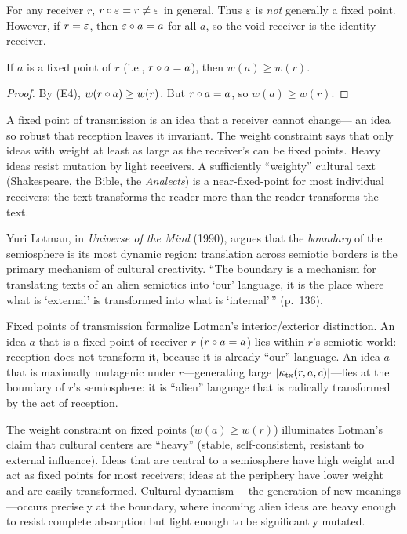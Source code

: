\begin{proposition}
For any receiver $r$, $r \circ \varepsilon = r \neq \varepsilon$ in general.
Thus $\varepsilon$ is \emph{not} generally a fixed point. However, if $r = \varepsilon$,
then $\varepsilon \circ a = a$ for all $a$, so the void receiver is the
identity receiver.
\end{proposition}

\begin{theorem}
If $a$ is a fixed point of $r$ (i.e., $r \circ a = a$), then
$w(a) \geq w(r)$.
\end{theorem}
\begin{proof}
By (E4), $w(r \circ a) \geq w(r)$. But $r \circ a = a$, so
$w(a) \geq w(r)$.
\end{proof}

\begin{interpretation}
A fixed point of transmission is an idea that a receiver cannot change---
an idea so robust that reception leaves it invariant. The weight constraint
says that only ideas with weight at least as large as the receiver's can
be fixed points. Heavy ideas resist mutation by light receivers. A
sufficiently ``weighty'' cultural text (Shakespeare, the Bible, the
\emph{Analects}) is a near-fixed-point for most individual receivers:
the text transforms the reader more than the reader transforms the text.
\end{interpretation}

\begin{interpretation}\label{interp:ch7:lotman_boundary}
Yuri Lotman, in \emph{Universe of the Mind} (1990), argues that the
\emph{boundary} of the semiosphere is its most dynamic region: translation
across semiotic borders is the primary mechanism of cultural creativity.
``The boundary is a mechanism for translating texts of an alien semiotics
into `our' language, it is the place where what is `external' is
transformed into what is `internal'\,'' (p.~136).

Fixed points of transmission formalize Lotman's interior/exterior
distinction. An idea $a$ that is a fixed point of receiver $r$
($r \circ a = a$) lies within $r$'s semiotic world: reception does
not transform it, because it is already ``our'' language. An idea $a$
that is maximally mutagenic under $r$---generating large
$|\kappa_{\text{tx}}(r, a, c)|$---lies at the boundary of $r$'s
semiosphere: it is ``alien'' language that is radically transformed by
the act of reception.

The weight constraint on fixed points ($w(a) \geq w(r)$) illuminates
Lotman's claim that cultural centers are ``heavy'' (stable, self-consistent,
resistant to external influence). Ideas that are central to a semiosphere
have high weight and act as fixed points for most receivers; ideas at the
periphery have lower weight and are easily transformed. Cultural dynamism
---the generation of new meanings---occurs precisely at the boundary,
where incoming alien ideas are heavy enough to resist complete absorption
but light enough to be significantly mutated.
\end{interpretation}

